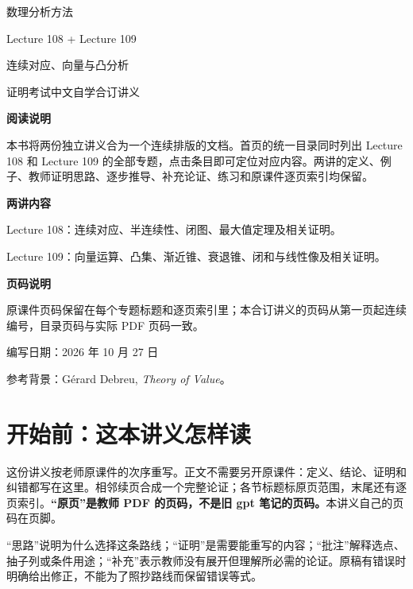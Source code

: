 \documentclass[11pt,a4paper]{article}
\theoremstyle{definition}\newtheorem{definition}{定义}\newtheorem{example}{例}
\begin{document}
\begin{titlepage}
\vspace*{1.4cm}
{\Huge\sffamily 数理分析方法\par}
\vspace{.8cm}
{\LARGE\sffamily Lecture 108 + Lecture 109\par}
\vspace{.4cm}
{\Large 连续对应、向量与凸分析\par}
\vspace{.9cm}
{\Large 证明考试中文自学合订讲义\par}
\vspace{1cm}
\textbf{阅读说明}\par
本书将两份独立讲义合为一个连续排版的文档。首页的统一目录同时列出 Lecture 108 和 Lecture 109 的全部专题，点击条目即可定位对应内容。两讲的定义、例子、教师证明思路、逐步推导、补充论证、练习和原课件逐页索引均保留。\par
\vspace{.6cm}
\textbf{两讲内容}\par
Lecture 108：连续对应、半连续性、闭图、最大值定理及相关证明。\par
Lecture 109：向量运算、凸集、渐近锥、衰退锥、闭和与线性像及相关证明。\par
\vspace{.6cm}
\textbf{页码说明}\par
原课件页码保留在每个专题标题和逐页索引里；本合订讲义的页码从第一页起连续编号，目录页码与实际 PDF 页码一致。\par
\vfill
编写日期：2026 年 10 月 27 日\par
参考背景：Gérard Debreu, \emph{Theory of Value}。\par
\end{titlepage}
\setcounter{page}{2}
\tableofcontents
\clearpage

\section*{开始前：这本讲义怎样读}
这份讲义按老师原课件的次序重写。正文不需要另开原课件：定义、结论、证明和纠错都写在这里。相邻续页合成一个完整论证；各节标题标原页范围，末尾还有逐页索引。\textbf{“原页”是教师 PDF 的页码，不是旧 gpt 笔记的页码。}本讲义自己的页码在页脚。

“思路”说明为什么选择这条路线；“证明”是需要能重写的内容；“批注”解释选点、抽子列或条件用途；“补充”表示教师没有展开但理解所必需的论证。原稿有错误时明确给出修正，不能为了照抄路线而保留错误等式。
\end{document}
